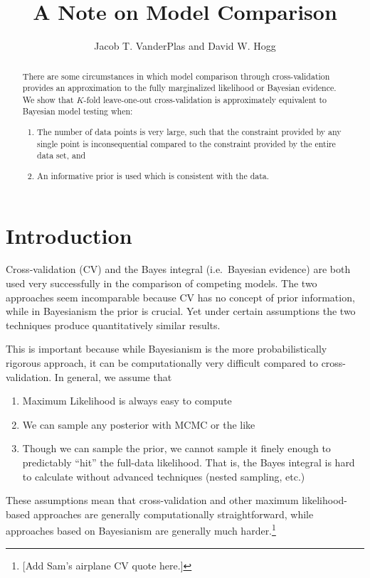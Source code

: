 \documentclass[12pt]{article}
\title{A Note on Model Comparison}
\author{Jacob T. VanderPlas and David W. Hogg}
\newcommand{\comment}[1]{{\color{red} [#1]}}
\begin{document}
\maketitle

\begin{abstract}
There are some circumstances in which model comparison through cross-validation
provides an approximation to the fully marginalized likelihood or Bayesian
evidence.  We show that $K$-fold leave-one-out cross-validation is
approximately equivalent to Bayesian model testing when:
\begin{enumerate}
  \item The number of data points is very large, such that the constraint
    provided by any single point is inconsequential compared to the constraint
    provided by the entire data set, and
  \item An informative prior is used which is consistent with the data.
\end{enumerate}
\end{abstract}

\section{Introduction}
Cross-validation (CV) and the Bayes integral (i.e.~Bayesian evidence)
are both used very successfully in
the comparison of competing models.  The two approaches seem incomparable
because CV has no concept of prior information, while in Bayesianism the
prior is crucial.  Yet under certain assumptions the two techniques produce
quantitatively similar results.

This is important because while Bayesianism is the more probabilistically
rigorous approach, it can be computationally very difficult compared to
cross-validation.  In general, we assume that
\begin{enumerate}
  \item Maximum Likelihood is always easy to compute
  \item We can sample any posterior with MCMC or the like
  \item Though we can sample the prior, we cannot sample it finely enough
    to predictably ``hit'' the full-data likelihood.  That is, the Bayes 
    integral is hard to calculate without advanced techniques
    (nested sampling, etc.)
\end{enumerate}
These assumptions mean that cross-validation and other maximum
likelihood-based approaches are generally computationally straightforward,
while approaches based on Bayesianism are generally much
harder.\footnote{\comment{Add Sam's airplane CV quote here.}}
\end{document}

